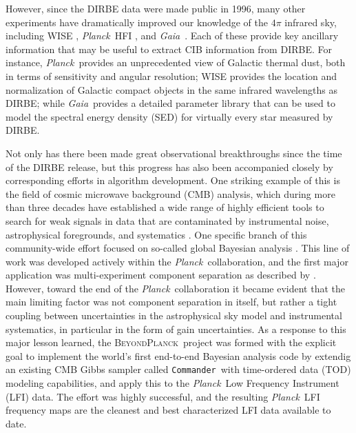 \documentclass{aa}
\def\commander{\texttt{Commander}}
\def\Planck{\textit{Planck}}
\def\Gaia{\textit{Gaia}}
\newcommand{\bp}{\textsc{BeyondPlanck}}
\begin{document}
However, since the DIRBE data were made public in 1996, many other experiments have dramatically improved our knowledge of the $4\pi$ infrared sky, including WISE \citep{wright:2010}, \Planck\ HFI \citep{planck2016-l03}, and \Gaia\ \citep{gaia:2016}. Each of these provide key ancillary information that may be useful to extract CIB information from  DIRBE. For instance, \Planck\ provides an unprecedented view of Galactic thermal dust, both in terms of sensitivity and angular resolution; WISE provides the location and normalization of Galactic compact objects in the same infrared wavelengths as DIRBE; while \Gaia\ provides a detailed parameter library that can be used to model the spectral energy density (SED) for virtually every star measured by DIRBE.

Not only has there been made great observational breakthroughs since the time of the DIRBE release, but this progress has also been accompanied closely by corresponding efforts in algorithm development. One striking example of this is the field of cosmic microwave background (CMB) analysis, which during more than three decades have established a wide range of highly efficient tools to search for weak signals in data that are contaminated by instrumental noise, astrophysical foregrounds, and systematics \citep[e.g.,][]{bennett2012,pb2015,planck2016-l01}. One specific branch of this community-wide effort focused on so-called global Bayesian analysis \citep{jewell2004,wandelt2004}. This line of work was developed actively within the \Planck\ collaboration, and the first major application was multi-experiment component separation as described by \citet{planck2014-a12}. However, toward the end of the \Planck\ collaboration it became evident that the main limiting factor was not component separation in itself, but rather a tight coupling between uncertainties in the astrophysical sky model and instrumental systematics, in particular in the form of gain uncertainties. As a response to this major lesson learned, the \bp\ project \citep{bp01} was formed with the explicit goal to implement the world's first end-to-end Bayesian analysis code by extendig an existing CMB Gibbs sampler called \commander\ with time-ordered data (TOD) modeling capabilities, and apply this to the \Planck\ Low Frequency Instrument (LFI) data. The effort was highly successful, and the resulting \Planck\ LFI frequency maps are the cleanest and best characterized LFI data available to date.
\end{document}
